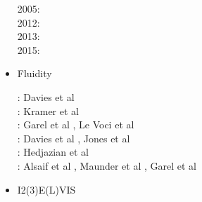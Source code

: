 \begin{itemize}
\begin{scriptsize}
2005: \cite{enbs05}\\
2012: \cite{crsg12}\\
2013: \cite{fusc13}\\
2015: \cite{fuks15}
\end{scriptsize}

\item Fluidity 

\begin{scriptsize}
\noindent
\twothousandeleven: Davies et al \cite{dawk11}\\
\twothousandtwelve: Kramer et al \cite{krwd12}\\
\twothousandfourteen: Garel et al \cite{gagd14}, Le Voci et al \cite{ledg14}\\
\twothousandsixteen: Davies et al \cite{dalg16}, Jones et al \cite{jodc16} \\
\twothousandseventeen: Hedjazian et al \cite{hegd17}\\
\twothousandtwenty: Alsaif et al \cite{algg20}, Maunder et al \cite{mapg20}, Garel et al \cite{gatt20}
\end{scriptsize}

\item {\codefont I2(3)E(L)VIS}  


\end{itemize}

